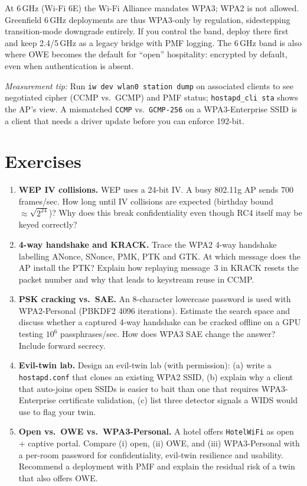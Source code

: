 {\begin{remark}
At 6\,GHz (Wi-Fi 6E) the Wi-Fi Alliance mandates WPA3; WPA2 is not allowed. Greenfield 6\,GHz deployments are thus WPA3-only by regulation, sidestepping transition-mode downgrade entirely. If you control the band, deploy there first and keep 2.4/5\,GHz as a legacy bridge with PMF logging. The 6\,GHz band is also where OWE becomes the default for ``open'' hospitality: encrypted by default, even when authentication is absent.
\end{remark}

\textit{Measurement tip:} Run \texttt{iw dev wlan0 station dump} on associated clients to see negotiated cipher (CCMP vs.\ GCMP) and PMF status; \texttt{hostapd\_cli sta} shows the AP's view. A mismatched \texttt{CCMP} vs.\ \texttt{GCMP-256} on a WPA3-Enterprise SSID is a client that needs a driver update before you can enforce 192-bit.

}

\section{Exercises}\label{sec:ch06-exercises}
\begin{enumerate}[label=E6.\arabic*, leftmargin=*, itemsep=0.6em]
    \item \textbf{WEP IV collisions.} WEP uses a 24-bit IV. A busy 802.11g AP sends 700 frames/sec. How long until IV collisions are expected (birthday bound $\approx \sqrt{2^{24}}$)? Why does this break confidentiality even though RC4 itself may be keyed correctly?
    \item \textbf{4-way handshake and KRACK.} Trace the WPA2 4-way handshake labelling ANonce, SNonce, PMK, PTK and GTK. At which message does the AP install the PTK? Explain how replaying message~3 in KRACK resets the packet number and why that leads to keystream reuse in CCMP.
    \item \textbf{PSK cracking vs.\ SAE.} An 8-character lowercase password is used with WPA2-Personal (PBKDF2 4096 iterations). Estimate the search space and discuss whether a captured 4-way handshake can be cracked offline on a GPU testing $10^6$ passphrases/sec. How does WPA3 SAE change the answer? Include forward secrecy.
    \item \textbf{Evil-twin lab.} Design an evil-twin lab (with permission): (a) write a \texttt{hostapd.conf} that clones an existing WPA2 SSID, (b) explain why a client that auto-joins open SSIDs is easier to bait than one that requires WPA3-Enterprise certificate validation, (c) list three detector signals a WIDS would use to flag your twin.
    \item \textbf{Open vs.\ OWE vs.\ WPA3-Personal.} A hotel offers \texttt{HotelWiFi} as open + captive portal. Compare (i) open, (ii) OWE, and (iii) WPA3-Personal with a per-room password for confidentiality, evil-twin resilience and usability. Recommend a deployment with PMF and explain the residual risk of a twin that also offers OWE.
\end{enumerate}



